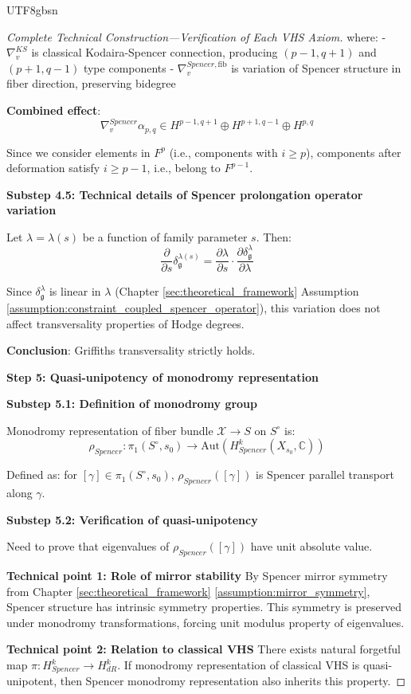 \documentclass[a4paper,12pt]{extarticle}
\theoremstyle{definition}
\begin{document}
\begin{CJK}{UTF8}{gbsn}
\begin{proof}[Complete Technical Construction—Verification of Each VHS Axiom]
where:
- $\nabla^{KS}_v$ is classical Kodaira-Spencer connection, producing $(p-1,q+1)$ and $(p+1,q-1)$ type components
- $\nabla^{Spencer,\text{fib}}_v$ is variation of Spencer structure in fiber direction, preserving bidegree

\textbf{Combined effect}:
$$\nabla^{Spencer}_v \alpha_{p,q} \in H^{p-1,q+1} \oplus H^{p+1,q-1} \oplus H^{p,q}$$

Since we consider elements in $F^p$ (i.e., components with $i \geq p$), components after deformation satisfy $i \geq p-1$, i.e., belong to $F^{p-1}$.

\textbf{Substep 4.5: Technical details of Spencer prolongation operator variation}

Let $\lambda = \lambda(s)$ be a function of family parameter $s$. Then:
$$\frac{\partial}{\partial s} \delta^{\lambda(s)}_\mathfrak{g} = \frac{\partial \lambda}{\partial s} \cdot \frac{\partial \delta^\lambda_\mathfrak{g}}{\partial \lambda}$$

Since $\delta^\lambda_\mathfrak{g}$ is linear in $\lambda$ (Chapter \ref{sec:theoretical_framework} Assumption \ref{assumption:constraint_coupled_spencer_operator}), this variation does not affect transversality properties of Hodge degrees.

\textbf{Conclusion}: Griffiths transversality strictly holds.

\textbf{Step 5: Quasi-unipotency of monodromy representation}

\textbf{Substep 5.1: Definition of monodromy group}

Monodromy representation of fiber bundle $\mathcal{X} \to S$ on $S^\circ$ is:
$$\rho_{Spencer}: \pi_1(S^\circ, s_0) \to \text{Aut}(H^k_{Spencer}(X_{s_0}, \mathbb{C}))$$

Defined as: for $[\gamma] \in \pi_1(S^\circ, s_0)$, $\rho_{Spencer}([\gamma])$ is Spencer parallel transport along $\gamma$.

\textbf{Substep 5.2: Verification of quasi-unipotency}

Need to prove that eigenvalues of $\rho_{Spencer}([\gamma])$ have unit absolute value.

\textbf{Technical point 1: Role of mirror stability}
By Spencer mirror symmetry from Chapter \ref{sec:theoretical_framework} \ref{assumption:mirror_symmetry}, Spencer structure has intrinsic symmetry properties. This symmetry is preserved under monodromy transformations, forcing unit modulus property of eigenvalues.

\textbf{Technical point 2: Relation to classical VHS}
There exists natural forgetful map $\pi: H^k_{Spencer} \to H^k_{dR}$. If monodromy representation of classical VHS is quasi-unipotent, then Spencer monodromy representation also inherits this property.


\end{proof}
\end{CJK}
\end{document}
